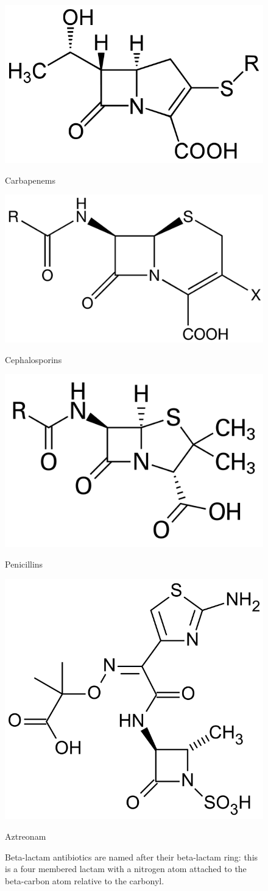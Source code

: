 \documentclass[11pt]{report}
\begin{document}
\clearpage
\begin{figure}[ht]
\label{beta_lactam} 
  \noindent\begin{minipage}[b]{0.5\linewidth}
    \includegraphics[width=.5\linewidth]{img/carbapenem.png} 
    \caption*{Carbapenems} 
  \end{minipage}%
  \noindent\begin{minipage}[b]{0.5\linewidth}
    \includegraphics[width=.5\linewidth]{img/cephalosporin.png} 
    \caption*{Cephalosporins} 
  \end{minipage}
  \noindent\begin{minipage}[b]{0.5\linewidth}
    \includegraphics[width=.5\linewidth]{img/penicillin.png} 
    \caption*{Penicillins}
  \end{minipage}%
  \hfill
  \noindent\begin{minipage}[b]{0.5\linewidth}
    \includegraphics[width=.5\linewidth]{img/aztreonam.png} 
    \caption*{Aztreonam} 
  \end{minipage}%
  \caption{Beta-lactam antibiotics are named after their beta-lactam ring: this is a four membered lactam with a nitrogen atom attached to the beta-carbon atom relative to the carbonyl.}
  \label{beta_lact}
\end{figure}
\end{document}
